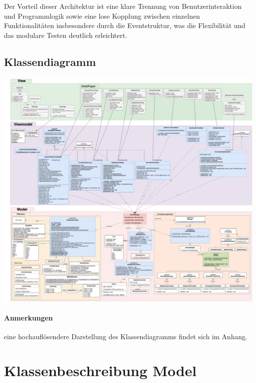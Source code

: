 \documentclass[a4paper,12pt]{article}
\begin{document}
  Der Vorteil dieser Architektur ist eine klare Trennung von Benutzerinteraktion und Programmlogik sowie eine lose Kopplung zwischen einzelnen Funktionalitäten insbesondere durch die Eventstruktur, was die Flexibilität und das modulare Testen deutlich erleichtert.
\clearpage
  \subsection{Klassendiagramm}
  \begin{center}
	\includegraphics[width=\textwidth]{Diagramme/uebersicht/Klassendiagram_KOMPAKT.png}
\end{center}
\paragraph{Anmerkungen}
eine hochauflösendere Darstellung des Klassendiagramms findet sich im Anhang.
\clearpage
\section{Klassenbeschreibung Model}
\end{document}
